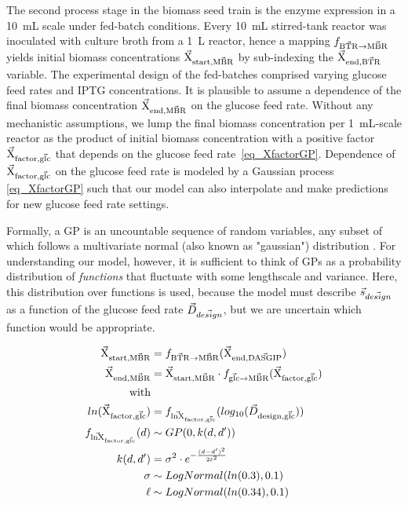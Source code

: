 \documentclass[sn-standardnature]{sn-jnl}%
\def\vec{\mathaccent "017E\relax }
\theoremstyle{thmstyleone}%
\theoremstyle{thmstyletwo}%
\theoremstyle{thmstylethree}%
\begin{document}
The second process stage in the biomass seed train is the enzyme expression in a 10~mL scale under fed-batch conditions.
Every 10~mL stirred-tank reactor was inoculated with culture broth from a 1~L reactor, hence a mapping $f_\mathrm{\vec{BTR} \rightarrow \vec{MBR}}$ yields initial biomass concentrations $\mathrm{\vec{X}_{start,\vec{MBR}}}$ by sub-indexing the $\mathrm{\vec{X}_{end,\vec{BTR}}}$ variable.
The experimental design of the fed-batches comprised varying glucose feed rates and IPTG concentrations.
It is plausible to assume a dependence of the final biomass concentration $\mathrm{\vec{X}_{end,\vec{MBR}}}$ on the glucose feed rate.
Without any mechanistic assumptions, we lump the final biomass concentration per 1~mL-scale reactor as the product of initial biomass concentration with a positive factor $\mathrm{\vec{X}_{factor,\vec{glc}}}$ that depends on the glucose feed rate~\eqref{eq_XfactorGP}.
Dependence of $\mathrm{\vec{X}_{factor,\vec{glc}}}$ on the glucose feed rate is modeled by a Gaussian process \eqref{eq_XfactorGP} such that our model can also interpolate and make predictions for new glucose feed rate settings.

Formally, a GP is an uncountable sequence of random variables, any subset of which follows a multivariate normal (also known as "gaussian") distribution \cite{gpdefinition}.
For understanding our model, however, it is sufficient to think of GPs as a probability distribution of \textit{functions} that fluctuate with some lengthscale and variance.
Here, this distribution over functions is used, because the model must describe $\vec{s}_{\vec{design}}$ as a function of the glucose feed rate $\vec{D}_{\vec{design}}$, but we are uncertain which function would be appropriate.

\begin{equation}
\begin{aligned}
    \mathrm{\vec{X}_{start,\vec{MBR}}} &= f_\mathrm{\vec{BTR} \rightarrow \vec{MBR}}(\mathrm{\vec{X}_{end,\vec{DASGIP}}}) \\
    \mathrm{\vec{X}_{end,\vec{MBR}}} &= \mathrm{\vec{X}_{start,\vec{MBR}}} \cdot f_{\mathrm{\vec{glc} \rightarrow \vec{MBR}}}(\mathrm{\vec{X}_{factor,\vec{glc}}}) \\
    \textrm{with} \\
    ln(\mathrm{\vec{X}_{factor,\vec{glc}}}) &= f_\mathrm{\vec{lnX}_{factor,\vec{glc}}}(log_{10}(\vec{D}_\mathrm{design,\vec{glc}})) \\
    f_\mathrm{\vec{lnX}_{factor,\vec{glc}}}(d) &\sim GP(0, k(d,d')) \\
    k(d,d') &= \sigma^2 \cdot e^{-\frac{(d-d')^2}{2\ell^2}} \\
    \sigma &\sim LogNormal(ln(0.3), 0.1) \\
    \ell &\sim LogNormal(ln(0.34), 0.1)
\end{aligned}
\label{eq_XfactorGP}
\end{equation}
\end{document}
